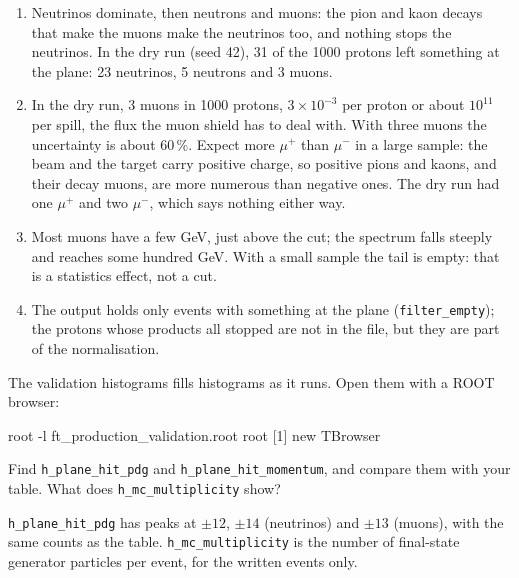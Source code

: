 \begin{solution}
\begin{enumerate}
  \item Neutrinos dominate, then neutrons and muons: the pion and kaon
        decays that make the muons make the neutrinos too, and nothing stops
        the neutrinos. In the dry run (seed 42), 31 of the 1000 protons left
        something at the plane: 23 neutrinos, 5 neutrons and 3 muons.
  \item In the dry run, 3 muons in 1000 protons, $3\times10^{-3}$ per proton
        or about $10^{11}$ per spill, the flux the muon shield has to deal
        with. With three muons the uncertainty is about 60\,\%. Expect more
        $\mu^+$ than $\mu^-$ in a large sample: the beam and the target carry
        positive charge, so positive pions and kaons, and their decay muons,
        are more numerous than negative ones. The dry run had one $\mu^+$ and
        two $\mu^-$, which says nothing either way.
  \item Most muons have a few GeV, just above the cut; the spectrum falls
        steeply and reaches some hundred GeV. With a small sample the tail is
        empty: that is a statistics effect, not a cut.
  \item The output holds only events with something at the plane
        (\texttt{filter\_empty}); the protons whose products all stopped are
        not in the file, but they are part of the normalisation.
\end{enumerate}
\end{solution}

\begin{exercise}{The validation histograms}
 fills histograms as it runs. Open them with a ROOT browser:
\begin{shell}
root -l ft_production_validation.root
root [1] new TBrowser
\end{shell}
Find \texttt{h\_plane\_hit\_pdg} and \texttt{h\_plane\_hit\_momentum}, and
compare them with your table. What does \texttt{h\_mc\_multiplicity} show?
\end{exercise}

\begin{solution}
\texttt{h\_plane\_hit\_pdg} has peaks at $\pm 12$, $\pm 14$ (neutrinos) and
$\pm 13$ (muons), with the same counts as the table. \texttt{h\_mc\_multiplicity}
is the number of final-state generator particles per event, for the written
events only.
\end{solution}

